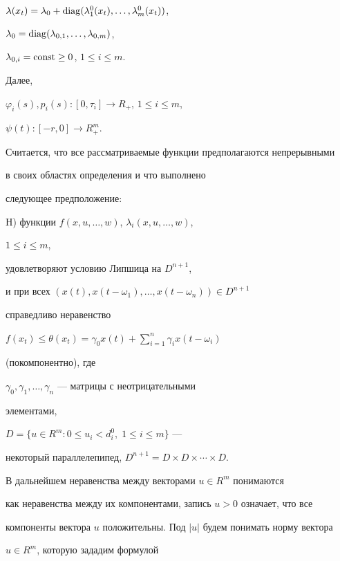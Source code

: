 $\lambda(x_t)=\lambda_0 +


\diag(\lambda_1^0(x_t),\dotsc,\lambda_m^0(x_t))$,


$\lambda_0=\operatorname{diag}(\lambda_{0,1},\dotsc,\lambda_{0,m})$,


$\lambda_{0,i}=\operatorname{const}\ge 0$, $1 \le i \le m$.


Далее,


$\varphi_i(s),p_i(s):[0,\tau_i] \to R_+$, $1 \le i \le m$,


$\psi (t):[-r,0] \to R^m_+$.





Считается, что все рассматриваемые функции предполагаются непрерывными


в своих областях определения и что выполнено


следующее предположение:


\medskip





{H)} функции $f(x,u,\dotsc,w)$, $\lambda_i(x,u,\dotsc,w)$,


$1 \le i \le m$,


удовлетворяют условию Липшица на $D^{n+1}$,


и при всех $(x(t),x(t-\omega_1),\dotsc,x(t-\omega_n)) \in D^{n+1}$


справедливо неравенство


$f(x_t) \le \theta(x_t)=\gamma_0x(t)


+\sum\limits_{i=1}^n\gamma_ix(t-\omega_i)$


(покомпонентно), где


$\gamma_0,\gamma_1,\dotsc,\gamma_n$ --- матрицы с неотрицательными


элементами,


$D=\{u\in R^m:0 \le u_i < d^0_i,\; 1 \le i \le m\}$ ---


некоторый параллелепипед, $D^{n+1}=D\times D\times\dotsb\times D$.


\medskip





В дальнейшем неравенства между векторами $u \in R^m$ понимаются


как неравенства между их компонентами, запись $u>0$ означает, что все


компоненты вектора $u$ положительны. Под $|u|$ будем понимать норму вектора


$u \in R^m$, которую зададим формулой


